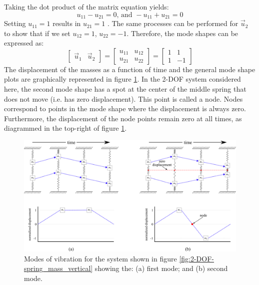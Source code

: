 \documentclass[12pt,letter]{article}
\begin{document}
\begin{example}
	Taking the dot product of the matrix equation yields:
	\begin{equation}
		u_{11} - u_{21}=0 \text{, and } - u_{11} + u_{21}=0
	\end{equation}
	Setting $u_{11} = 1$ results in $u_{21} = 1$ . The same processes can be performed for $\vec{u}_2$ to show that if we set $u_{12} = 1$, $u_{22} = -1$. Therefore, the mode shapes can be expressed as:
	\begin{equation}
		 \begin{bmatrix} \vec{u}_1 & \vec{u}_2 \end{bmatrix} = \begin{bmatrix}  u_{11} & u_{12} \\ u_{21} & u_{22} \end{bmatrix} = \begin{bmatrix}  1 & 1 \\ 1 & -1 \end{bmatrix}
	\end{equation}
	The displacement of the masses as a function of time and the general mode shape plots are graphically represented in figure \ref{fig:2-DOF_mode_shape}. In the 2-DOF system considered here, the second mode shape has a spot at the center of the middle spring that does not move (i.e. has zero displacement). This point is called a node. Nodes correspond to points in the mode shape where the displacement is always zero. Furthermore, the displacement of the node points remain zero at all times, as diagrammed in the top-right of figure \ref{fig:2-DOF_mode_shape}.
	
	\begin{figure}[H]
		\centering
		\includegraphics[width=\linewidth]{../figures/2-DOF_mode_shape.png}
		\caption{Modes of vibration for the system shown in figure \ref{fig:2-DOF-spring_mass_vertical} showing the: (a) first mode; and (b) second mode.}
		\label{fig:2-DOF_mode_shape}
	\end{figure}
	\end{example}
	
\end{document}
